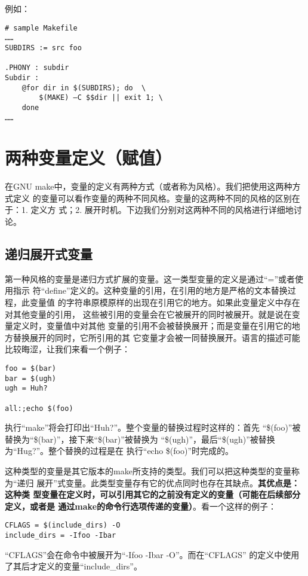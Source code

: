例如：
\begin{Verbatim}[]
# sample Makefile
……
SUBDIRS := src foo

.PHONY : subdir
Subdir :
    @for dir in $(SUBDIRS); do  \
        $(MAKE) –C $$dir || exit 1; \
    done
……
\end{Verbatim}


\section{两种变量定义（赋值）}
在GNU make中，变量的定义有两种方式（或者称为风格）。我们把使用这两种方式定义
的变量可以看作变量的两种不同风格。变量的这两种不同的风格的区别在于：1. 定义方
式；2. 展开时机。下边我们分别对这两种不同的风格进行详细地讨论。

\subsection{递归展开式变量}
第一种风格的变量是递归方式扩展的变量。这一类型变量的定义是通过“=”或者使用指示
符“define”定义的。这种变量的引用，在引用的地方是严格的文本替换过程，此变量值
的字符串原模原样的出现在引用它的地方。如果此变量定义中存在对其他变量的引用，
这些被引用的变量会在它被展开的同时被展开。就是说在变量定义时，变量值中对其他
变量的引用不会被替换展开；而是变量在引用它的地方替换展开的同时，它所引用的其
它变量才会被一同替换展开。语言的描述可能比较晦涩，让我们来看一个例子：
\begin{Verbatim}[]
foo = $(bar)
bar = $(ugh)
ugh = Huh?
 	
all:;echo $(foo)
\end{Verbatim}

执行“make”将会打印出“Huh?”。整个变量的替换过程时这样的：首先
“\$(foo)”被替换为“\$(bar)”，接下来“\$(bar)”被替换为
“\$(ugh)”，最后“\$(ugh)”被替换为“Hug?”。整个替换的过程是在
执行“echo \$(foo)”时完成的。

这种类型的变量是其它版本的make所支持的类型。我们可以把这种类型的变量称为“递归
展开”式变量。此类型变量存有它的优点同时也存在其缺点。\textbf{其优点是：这种类
型变量在定义时，可以引用其它的之前没有定义的变量（可能在后续部分定义，或者是
通过make的命令行选项传递的变量）}。看一个这样的例子：

\begin{Verbatim}[]
CFLAGS = $(include_dirs) -O
include_dirs = -Ifoo -Ibar
\end{Verbatim}

“CFLAGS”会在命令中被展开为“-Ifoo -Ibar -O”。而在“CFLAGS”
的定义中使用了其后才定义的变量“include\_dirs”。

